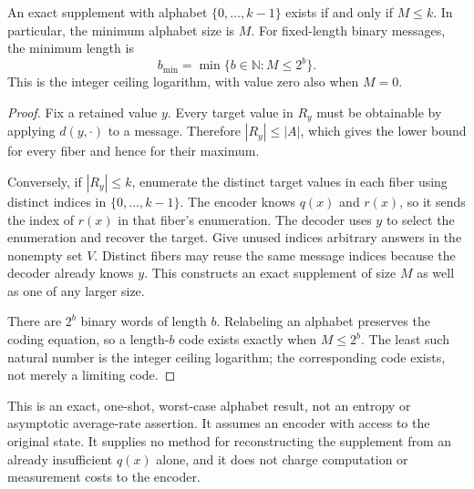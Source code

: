 \begin{theorem}\label{thm:supplement-alphabet}
An exact supplement with alphabet $\{0,\ldots,k-1\}$ exists if and
only if $M\le k$. In particular, the minimum alphabet size is $M$.
For fixed-length binary messages, the minimum length is
\[
 b_{\min}=\min\{b\in\mathbb N:M\le 2^b\}.
\]
This is the integer ceiling logarithm, with value zero also when $M=0$.
\end{theorem}
\begin{proof}
Fix a retained value $y$. Every target value in $R_y$ must be obtainable
by applying $d(y,\cdot)$ to a message. Therefore $|R_y|\le |A|$,
which gives the lower bound for every fiber and hence for their maximum.

Conversely, if $|R_y|\le k$, enumerate the distinct target values in
each fiber using distinct indices in $\{0,\ldots,k-1\}$. The encoder
knows $q(x)$ and $r(x)$, so it sends the index of $r(x)$ in that fiber's
enumeration. The decoder uses $y$ to select the enumeration and recover
the target. Give unused indices arbitrary answers in the nonempty set
$V$. Distinct fibers may reuse the same message indices because the
decoder already knows $y$. This constructs an exact supplement of
size $M$ as well as one of any larger size.

There are $2^b$ binary words of length $b$. Relabeling an alphabet
preserves the coding equation, so a length-$b$ code exists exactly
when $M\le2^b$. The least such natural number is the integer ceiling
logarithm; the corresponding code exists, not merely a limiting code.
\end{proof}
This is an exact, one-shot, worst-case alphabet result, not an entropy
or asymptotic average-rate assertion. It assumes an encoder with access
to the original state. It supplies no method for reconstructing the
supplement from an already insufficient $q(x)$ alone, and it does not
charge computation or measurement costs to the encoder.

